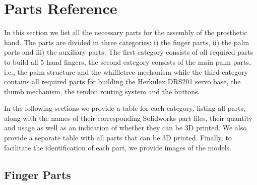 \section{Parts Reference}

In this section we list all the necessary parts for the assembly of the prosthetic hand. The parts are divided in three categories: i) the finger parts, ii) the palm parts and iii) the auxiliary parts. The first category consists of all required parts to build all 5 hand fingers, the second category consists of the main palm parts, i.e., the palm structure and the whiffletree mechanism while the third category contains all required parts for building the Herkulex DRS201 servo base, the thumb mechanism, the tendon routing system and the buttons. 


In the following sections we provide a table for each category, listing all parts, along with the names of their corresponding Solidworks part files, their quantity and usage as well as an indication of whether they can be 3D printed. We also provide a separate table with all parts that can be 3D printed. Finally, to facilitate the identification of each part, we provide images of the models. 

\subsection{Finger Parts}



